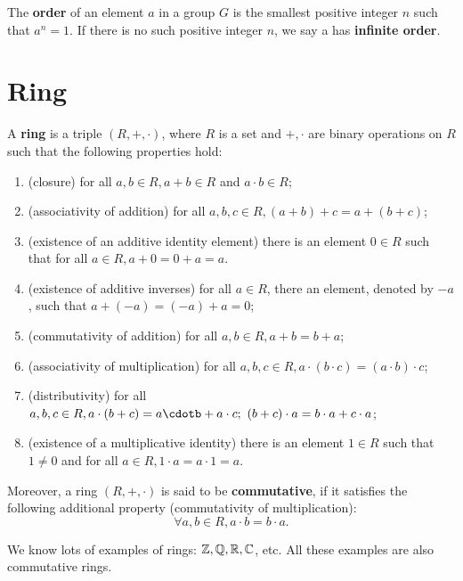 \documentclass[12pt]{book}
\begin{document}
\begin{defi}\label{def:group4}
      The \textbf{order} of an element $a$ in a group $G$ is the smallest positive integer $n$ such that $a^n =1$. If there is no 
	  such positive integer $n$, we say a has \textbf{infinite order}.
\end{defi}
\section{Ring}
\label{sec:Ring}

\begin{defi}\label{def:ring1}
      A \textbf{ring} is a triple $(R,+, \cdot)$, where $R$ is a set and $+, \cdot$ are binary operations on $R$ such that the following properties hold:
      \begin{enumerate}
	         \item (closure) for all $a, b \in R, a + b \in R$ and $a \cdot b \in R$;
			 \item (associativity of addition) for all $a, b, c \in R, (a+b) +c = a +(b+c)$;
			 \item (existence of an additive identity element) there is an element $0 \in R$ such that for all $a \in R, a + 0 = 0 + a = a$.
			 \item (existence of additive inverses) for all $a \in R$, there an element, denoted by $-a$, such that $a +(-a) = (-a)+ a = 0$;
			 \item (commutativity of addition) for all $a, b \in R, a + b = b +a$;
			 \item (associativity of multiplication) for all $a, b, c \in R, a \cdot (b \cdot c) = (a \cdot b) \cdot c$;
			 \item (distributivity) for all $a, b, c \in R, a \cdot (b + c) = a \cdotb + a \cdot c; \ (b + c) \cdot a = b \cdot a + c \cdot a$;
			 \item (existence of a multiplicative identity) there is an element $1 \in R$ such that $1 \not = 0$ and for all $a \in R, 1 \cdot a = a \cdot 1 = a$.
	  \end{enumerate}
\end{defi}

Moreover, a ring $(R,+, \cdot)$ is said to be \textbf{commutative}, if it satisfies the following additional property (commutativity of multiplication):
$$ \forall a, b \in R, a \cdot b = b \cdot a.$$

\begin{examp}\label{exp:ring1}
      We know lots of examples of rings: $\mathbb{Z}, \mathbb{Q}, \mathbb{R}, \mathbb{C}$,  etc.
      All these examples are also commutative rings.
\end{examp}
\end{document}
